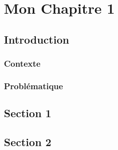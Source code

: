 
\chapter{Mon Chapitre 1}



\section{Introduction}

\subsection{Contexte}

\subsection{Problématique}

\section{Section 1}

\section{Section 2}
